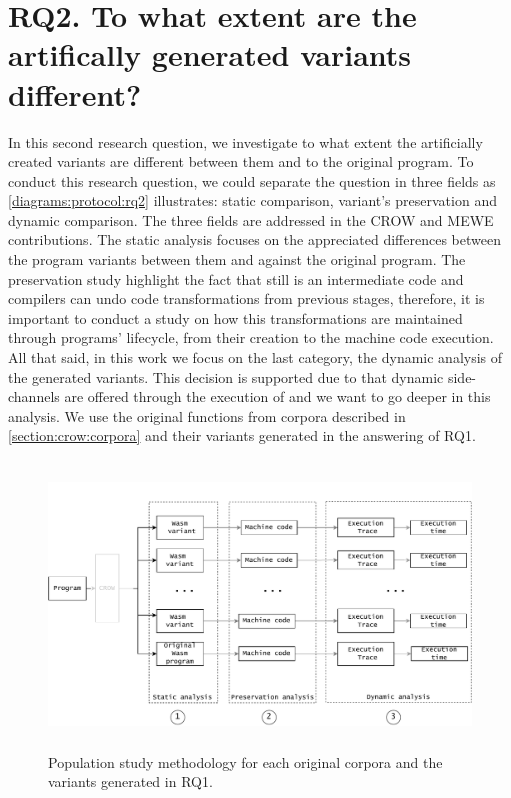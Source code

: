 
\section{RQ2. To what extent are the artifically generated variants different?}

In this second research question, we investigate to what extent the artificially created variants are different between them and to the original program. To conduct this research question, we could separate the question in three fields as \autoref{diagrams:protocol:rq2} illustrates: static comparison, variant's preservation and  dynamic comparison. The three fields are addressed in the CROW and MEWE contributions.
The static analysis focuses on the appreciated differences between the program variants between them and against the original program. The preservation study highlight the fact that \wasm still is an intermediate code and compilers can undo code transformations from previous stages, therefore, it is important to conduct a study on how this transformations are maintained through \wasm programs' lifecycle, from their creation to the machine code execution.
All that said, in this work we focus on the last category, the dynamic analysis of the generated variants. This decision is supported due to that dynamic side-channels are offered through the execution of \wasm and we want to go deeper in this analysis.
We use the original functions from corpora described in \autoref{section:crow:corpora} and their variants generated in the answering of RQ1. 

\begin{figure}[h]
    \centering
    \includegraphics[height=3in]{diagrams/Rq2.pdf}
    \caption{Population study methodology for each original corpora and the variants generated in RQ1.}
    \label{diagrams:protocol:rq2}
\end{figure}

